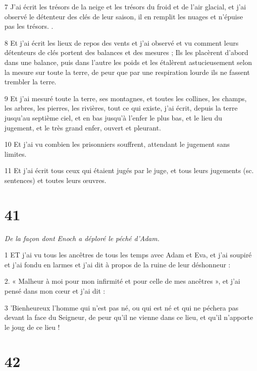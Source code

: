 \par 7 J'ai écrit les trésors de la neige et les trésors du froid et de l'air glacial, et j'ai observé le détenteur des clés de leur saison, il en remplit les nuages ​​et n'épuise pas les trésors. .

\par 8 Et j'ai écrit les lieux de repos des vents et j'ai observé et vu comment leurs détenteurs de clés portent des balances et des mesures ; Ils les placèrent d'abord dans une balance, puis dans l'autre les poids et les étalèrent astucieusement selon la mesure sur toute la terre, de peur que par une respiration lourde ils ne fassent trembler la terre.

\par 9 Et j'ai mesuré toute la terre, ses montagnes, et toutes les collines, les champs, les arbres, les pierres, les rivières, tout ce qui existe, j'ai écrit, depuis la terre jusqu'au septième ciel, et en bas jusqu'à l'enfer le plus bas, et le lieu du jugement, et le très grand enfer, ouvert et pleurant.

\par 10 Et j'ai vu combien les prisonniers souffrent, attendant le jugement sans limites.

\par 11 Et j'ai écrit tous ceux qui étaient jugés par le juge, et tous leurs jugements (sc. sentences) et toutes leurs œuvres.

\chapter{41}

\par \textit{De la façon dont Enoch a déploré le péché d'Adam.}

\par 1 ET j'ai vu tous les ancêtres de tous les temps avec Adam et Eva, et j'ai soupiré et j'ai fondu en larmes et j'ai dit à propos de la ruine de leur déshonneur :

\par 2. « Malheur à moi pour mon infirmité et pour celle de mes ancêtres », et j'ai pensé dans mon cœur et j'ai dit :

\par 3 'Bienheureux l'homme qui n'est pas né, ou qui est né et qui ne péchera pas devant la face du Seigneur, de peur qu'il ne vienne dans ce lieu, et qu'il n'apporte le joug de ce lieu !

\chapter{42}

